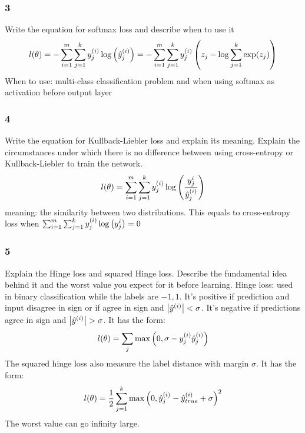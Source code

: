 \documentclass{article}
\begin{document}
\subsubsection*{3}
\begin{myleftlinebox}
    Write the equation for softmax loss and describe when to use it
    \tcbline
    \[l(\theta) = -\sum_{i=1}^m\sum_{j=1}^k y_j^{(i)}\log\left( \hat y_j^{(i)} \right)=-\sum_{i=1}^m\sum_{j=1}^k y_j^{(i)}\left( z_j-\log\sum_{j=1}^k\exp(z_j) \right)\]
    When to use: multi-class classification problem and when using softmax as activation before output layer
\end{myleftlinebox}
\subsubsection*{4}
\begin{myleftlinebox}
    Write the equation for Kullback-Liebler loss and explain its meaning. Explain the circumstances under which there is no difference between using cross-entropy or Kullback-Liebler to train the network.
    \tcblower
    \[l(\theta) = \sum_{i=1}^m\sum_{j=1}^k y_j^{(i)} \log\left( \frac{y_j^{i}}{\hat y_j^{(i)}} \right)  \]
    meaning: the similarity between two distributions. This equals to cross-entropy loss when \(\sum_{i=1}^m\sum_{j=1}^k y_j^{(i)} \log\left( y_j^{i} \right)=0\)
\end{myleftlinebox}

\subsubsection*{5}
\begin{myleftlinebox}
    Explain the Hinge loss and squared Hinge loss. Describe the fundamental idea behind it and the worst value you expect for it before learning.
    \tcbline
    Hinge loss: used in binary classification while the labels are \(-1,1\). It's positive if prediction and input disagree in sign or if agree in sign and \(\left\vert\hat y^{(i)}\right\vert<\sigma\). It's negative if predictions agree in sign and \(\left\vert\hat y^{(i)}\right\vert>\sigma\). It has the form:
    \[l(\theta)=\sum_j\max\left( 0,\sigma-y_j^{(i)}\hat y_j^{(i)} \right)\]
    The squared hinge loss also measure the label distance with margin \(\sigma\). It has the form:
    \[l(\theta)=\frac{1}{2}\sum_{j=1}^k \max\left( 0,\hat y_j^{(i)}-\hat y^{(i)}_{true}+\sigma \right)^2\]
    The worst value can go infinity large.
\end{myleftlinebox}
\end{document}
